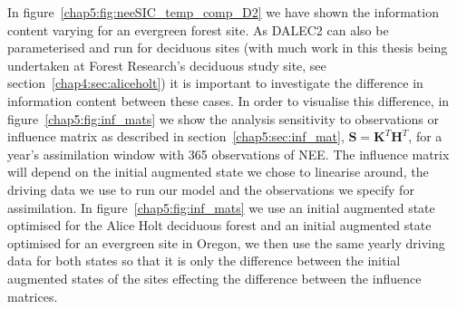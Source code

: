 In figure~\ref{chap5:fig:neeSIC_temp_comp_D2} we have shown the information content varying for an evergreen forest site. As DALEC2 can also be parameterised and run for deciduous sites (with much work in this thesis being undertaken at Forest Research's deciduous study site, see section~\ref{chap4:sec:aliceholt}) it is important to investigate the difference in information content between these cases. In order to visualise this difference, in figure~\ref{chap5:fig:inf_mats} we show the analysis sensitivity to observations or influence matrix \citep{Cardinali2004} as described in section~\ref{chap5:sec:inf_mat}, \(\textbf{S} = \textbf{K}^{T}\textbf{H}^{T}\), for a year's assimilation window with 365 observations of NEE. The influence matrix will depend on the initial augmented state we chose to linearise around, the driving data we use to run our model and the observations we specify for assimilation. In figure~\ref{chap5:fig:inf_mats} we use an initial augmented state optimised for the Alice Holt deciduous forest and an initial augmented state optimised for an evergreen site in Oregon, we then use the same yearly driving data for both states so that it is only the difference between the initial augmented states of the sites effecting the difference between the influence matrices.  

